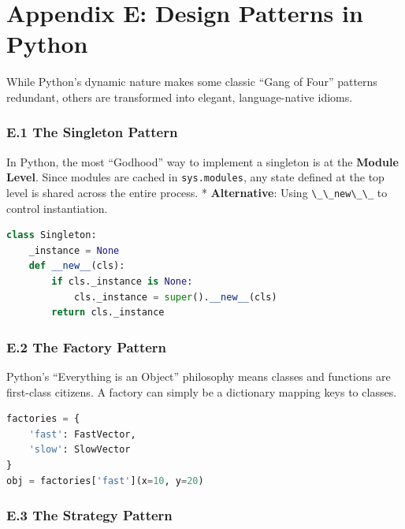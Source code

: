 \hypertarget{appendix-e-design-patterns-in-python}{%
\chapter{Appendix E: Design Patterns in
Python}\label{appendix-e-design-patterns-in-python}}

While Python's dynamic nature makes some classic ``Gang of Four''
patterns redundant, others are transformed into elegant, language-native
idioms.

\hypertarget{e.1-the-singleton-pattern}{%
\subsection{E.1 The Singleton Pattern}\label{e.1-the-singleton-pattern}}

In Python, the most ``Godhood'' way to implement a singleton is at the
\textbf{Module Level}. Since modules are cached in
\passthrough{\lstinline!sys.modules!}, any state defined at the top
level is shared across the entire process. * \textbf{Alternative}: Using
\passthrough{\lstinline!\_\_new\_\_!} to control instantiation.

\begin{lstlisting}[language=Python]
class Singleton:
    _instance = None
    def __new__(cls):
        if cls._instance is None:
            cls._instance = super().__new__(cls)
        return cls._instance
\end{lstlisting}

\hypertarget{e.2-the-factory-pattern}{%
\subsection{E.2 The Factory Pattern}\label{e.2-the-factory-pattern}}

Python's ``Everything is an Object'' philosophy means classes and
functions are first-class citizens. A factory can simply be a dictionary
mapping keys to classes.

\begin{lstlisting}[language=Python]
factories = {
    'fast': FastVector,
    'slow': SlowVector
}
obj = factories['fast'](x=10, y=20)
\end{lstlisting}

\hypertarget{e.3-the-strategy-pattern}{%
\subsection{E.3 The Strategy Pattern}\label{e.3-the-strategy-pattern}}

